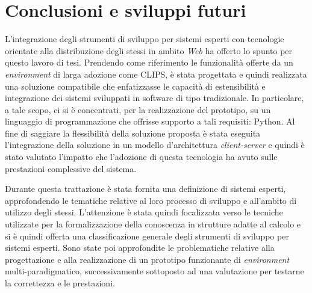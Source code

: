\chapter*{Conclusioni e sviluppi futuri}
\rhead{}



L'integrazione degli strumenti di sviluppo per sistemi esperti con tecnologie orientate alla distribuzione degli stessi in ambito \emph{Web} ha offerto lo spunto per questo lavoro di tesi. Prendendo come riferimento le funzionalità offerte da un \emph{environment} di larga adozione come CLIPS, è stata progettata e quindi realizzata una soluzione compatibile che enfatizzasse le capacità di estensibilità e integrazione dei sistemi sviluppati in software di tipo tradizionale. In particolare, a tale scopo, ci si è concentrati, per la realizzazione del prototipo, su un linguaggio di programmazione che offrisse supporto a tali requisiti: Python. Al fine di saggiare la flessibilità della soluzione proposta è stata eseguita l'integrazione della soluzione in un modello d'architettura \emph{client-server} e quindi è stato valutato l'impatto che l'adozione di questa tecnologia ha avuto sulle prestazioni complessive del sistema.

Durante questa trattazione è stata fornita una definizione di sistemi esperti, approfondendo le tematiche relative al loro processo di sviluppo e all'ambito di utilizzo degli stessi. L'attenzione è stata quindi focalizzata verso le tecniche utilizzate per la formalizzazione della conoscenza in strutture adatte al calcolo e si è quindi offerta una classificazione generale degli strumenti di sviluppo per sistemi esperti.
Sono state poi approfondite le problematiche relative alla progettazione e alla realizzazione di un prototipo funzionante di \emph{environment} multi-paradigmatico, successivamente sottoposto ad una valutazione per testarne la correttezza e le prestazioni.

